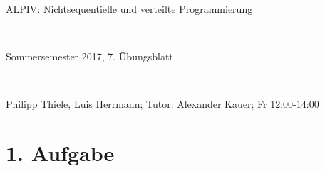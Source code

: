 \documentclass[numbers=noendperiod,10pt]{scrartcl}
\begin{document}
	
	
\hrulefill
\begin{center}
	\bfseries %
	\sffamily %
	\begin{huge}
		ALPIV: Nichtsequentielle und verteilte Programmierung
	\end{huge}\\
	\begin{Large}
		Sommersemester 2017, 7. Übungsblatt
	\end{Large}\\
	\begin{small}
		Philipp Thiele, Luis Herrmann; Tutor: Alexander Kauer; Fr 12:00-14:00
	\end{small}
	
	\vspace{-10pt}
\end{center}
\hrulefill

\newcommand{\inputmintedframed}[2]{
	\begin{mdframed}[linecolor=bg,backgroundcolor=bg]
		\inputminted[mathescape,breaklines,linenos,numbersep=5pt,tabsize=3]{#1}{#2}
\end{mdframed}}

\section*{1. Aufgabe}
\end{document}
